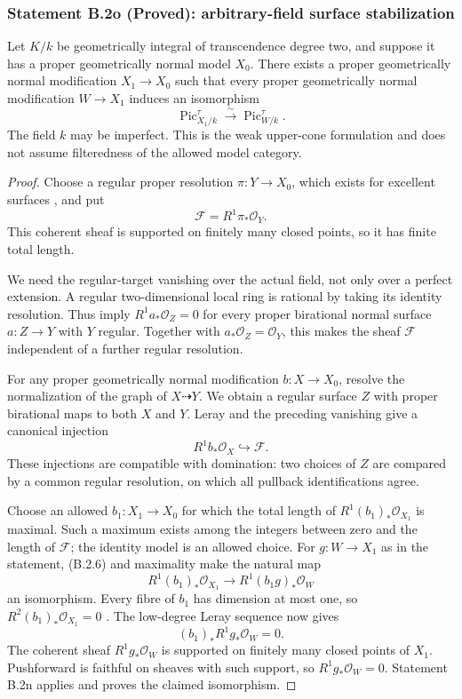 \subsubsection*{Statement B.2o (Proved): arbitrary-field surface stabilization}
\begin{theorem}
\label{B:B2-surface-stabilization}
Let $K/k$ be geometrically integral of transcendence degree two,
and suppose it has a proper geometrically normal model $X_0$.
There exists a proper geometrically normal modification $X_1\to X_0$
such that every proper geometrically normal modification $W\to X_1$
induces an isomorphism
\[
 \operatorname{Pic}^{\tau}_{X_1/k}
       \xrightarrow{\ \sim\ }\operatorname{Pic}^{\tau}_{W/k}.
\]
The field $k$ may be imperfect.  This is the weak upper-cone
formulation and does not assume filteredness of the allowed model
category.
\end{theorem}
\begin{proof}
Choose a regular proper resolution $\pi:Y\to X_0$, which exists
for excellent surfaces \cite[Introduction, Theorem, p.~151]
{Lipman1978}, and put
\[
                 \mathcal F=R^1\pi_*\mathcal O_Y.
\]
This coherent sheaf is supported on finitely many closed points,
so it has finite total length.

We need the regular-target vanishing over the actual field, not
only over a perfect extension.  A regular two-dimensional local
ring is rational by taking its identity resolution.  Thus
\cite[Definition 1.1 and Proposition 1.2(2), pp.~199--200]
{Lipman1969B} imply $R^1a_*\mathcal O_Z=0$ for every proper
birational normal surface $a:Z\to Y$ with $Y$ regular.
Together with $a_*\mathcal O_Z=\mathcal O_Y$, this makes
the sheaf $\mathcal F$ independent of a further regular resolution.

For any proper geometrically normal modification $b:X\to X_0$,
resolve the normalization of the graph of $X\dashrightarrow Y$.
We obtain a regular surface $Z$ with proper birational maps to
both $X$ and $Y$.  Leray and the preceding vanishing give a
canonical injection
\[
        R^1b_*\mathcal O_X\hookrightarrow\mathcal F.
        \tag{B.2.6}
\]
These injections are compatible with domination: two choices of
$Z$ are compared by a common regular resolution, on which all
pullback identifications agree.

Choose an allowed $b_1:X_1\to X_0$ for which the total length
of $R^1(b_1)_*\mathcal O_{X_1}$ is maximal.  Such a maximum
exists among the integers between zero and the length of
$\mathcal F$; the identity model is an allowed choice.
For $g:W\to X_1$ as in the statement, (B.2.6) and maximality
make the natural map
\[
 R^1(b_1)_*\mathcal O_{X_1}
       \longrightarrow R^1(b_1g)_*\mathcal O_W
\]
an isomorphism.  Every fibre of $b_1$ has dimension at most one,
so $R^2(b_1)_*\mathcal O_{X_1}=0$
\cite[Tag 0A4T]{StacksB}.  The low-degree Leray sequence now gives
\[
                   (b_1)_*R^1g_*\mathcal O_W=0.
\]
The coherent sheaf $R^1g_*\mathcal O_W$ is supported on finitely
many closed points of $X_1$.  Pushforward is faithful on sheaves
with such support, so $R^1g_*\mathcal O_W=0$.
Statement B.2n applies and proves the claimed isomorphism.
\end{proof}

